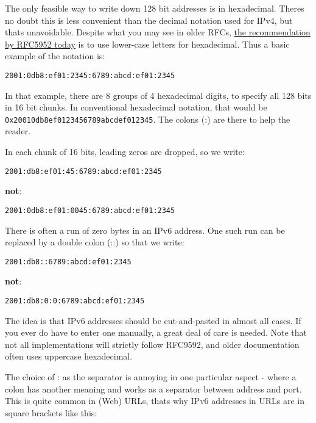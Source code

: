 \documentclass[
]{article}
\begin{document}
The only feasible way to write down 128 bit addresses is in hexadecimal.
There\textquotesingle s no doubt this is less convenient than the
decimal notation used for IPv4, but that\textquotesingle s unavoidable.
Despite what you may see in older RFCs,
\href{https://www.rfc-editor.org/info/rfc5952}{the recommendation by
RFC5952 today} is to use lower-case letters for hexadecimal. Thus a
basic example of the notation is:

\begin{verbatim}
2001:0db8:ef01:2345:6789:abcd:ef01:2345
\end{verbatim}

In that example, there are 8 groups of 4 hexadecimal digits, to specify
all 128 bits in 16 bit chunks. In conventional hexadecimal notation,
that would be \texttt{0x20010db8ef0123456789abcdef012345}. The colons
(\textquotesingle:\textquotesingle) are there to help the reader.

In each chunk of 16 bits, leading zeros are dropped, so we write:

\begin{verbatim}
2001:db8:ef01:45:6789:abcd:ef01:2345
\end{verbatim}

\textbf{not}:

\begin{verbatim}
2001:0db8:ef01:0045:6789:abcd:ef01:2345
\end{verbatim}

There is often a run of zero bytes in an IPv6 address. One such run can
be replaced by a double colon (\textquotesingle::\textquotesingle) so
that we write:

\begin{verbatim}
2001:db8::6789:abcd:ef01:2345
\end{verbatim}

\textbf{not}:

\begin{verbatim}
2001:db8:0:0:6789:abcd:ef01:2345
\end{verbatim}

The idea is that IPv6 addresses should be cut-and-pasted in almost all
cases. If you ever do have to enter one manually, a great deal of care
is needed. Note that not all implementations will strictly follow
RFC9592, and older documentation often uses uppercase hexadecimal.

The choice of \textquotesingle:\textquotesingle{} as the separator is
annoying in one particular aspect - where a colon has another meaning
and works as a separator between address and port. This is quite common
in (Web) URLs, that\textquotesingle s why IPv6 addresses in URLs are in
square brackets like this:
\end{document}
